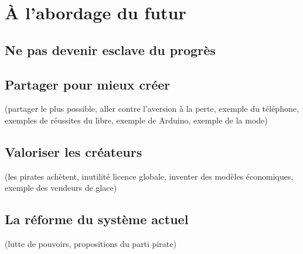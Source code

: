 \chapter{À l'abordage du futur}



\section{Ne pas devenir esclave du progrès}



\section{Partager pour mieux créer}
(partager le plus possible, aller contre l'aversion à la perte, exemple du téléphone, exemples de réussites du libre, exemple de Arduino, exemple de la mode)
\section{Valoriser les créateurs}
(les pirates achètent, inutilité licence globale, inventer des modèles économiques, exemple des vendeurs de glace)
\section{La réforme du système actuel}
(lutte de pouvoirs, propositions du parti pirate)
